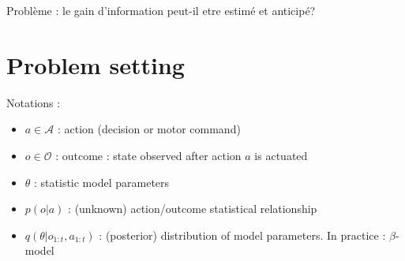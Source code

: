 \documentclass[10pt,letterpaper]{article}
\begin{document}

{\color{magenta} Problème : le gain d'information peut-il etre estimé et anticipé?}





\section{Problem setting}




Notations :
\begin{itemize}
    \item $a \in \mathcal{A}$ : action (decision or motor command)
    \item $o \in \mathcal{O}$ : outcome : state observed after action $a$ is actuated
    \item $\theta$ : statistic model parameters %
    \item $p(o|a)$ : (unknown) action/outcome statistical relationship
    \item $q(\theta|o_{1:t},a_{1:t})$ : (posterior) distribution of model parameters. In practice : $\beta$-model 
\end{itemize}
\end{document}
